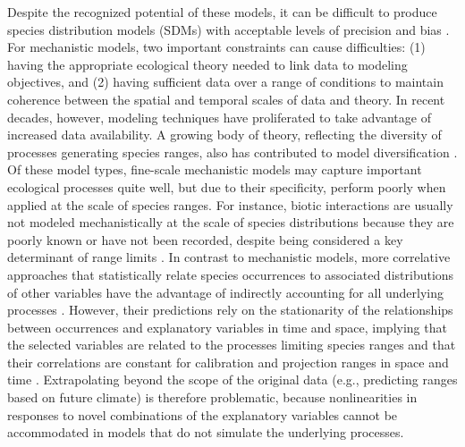 \documentclass[11pt]{article}
\begin{document}
Despite the recognized potential of these models, it can be difficult to produce species distribution models (SDMs) with acceptable levels of precision and bias \citep{Guisan2013}.
For mechanistic models, two important constraints can cause difficulties: (1) having the appropriate ecological theory needed to link data to modeling objectives, and (2) having sufficient data over a range of conditions to maintain coherence between the spatial and temporal scales of data and theory.
In recent decades, however, modeling techniques have proliferated to take advantage of increased data availability. 
A growing body of theory, reflecting the diversity of processes generating species ranges, also has contributed to model diversification \citep{Boulangeat2012}.
Of these model types, fine-scale mechanistic models may capture important ecological processes quite well, but due to their specificity, perform poorly when applied at the scale of species ranges.
For instance, biotic interactions are usually not modeled mechanistically at the scale of species distributions because they are poorly known or have not been recorded, despite being considered a key determinant of range limits \citep{Pigot2013}. 
In contrast to mechanistic models, more correlative approaches that statistically relate species occurrences to associated distributions of other variables have the advantage of indirectly accounting for all underlying processes \citep{Guisan2000}.
However, their predictions rely on the stationarity of the relationships between occurrences and explanatory variables in time and space, implying that the selected variables are related to the processes limiting species ranges and that their correlations are constant for calibration and projection ranges in space and time \citep{Dormann2007}. 
Extrapolating beyond the scope of the original data (e.g., predicting ranges based on future climate) is therefore problematic, because nonlinearities in responses to novel combinations of the explanatory variables cannot be accommodated in models that do not simulate the underlying processes.
\end{document}
